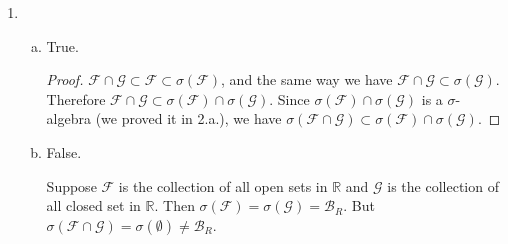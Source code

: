 \documentclass[11pt]{article}
\begin{document}
\begin{enumerate}[1.]
\begin{enumerate}[(a)]
\begin{proof}
            Then we have $\mathcal{A}$ is a countable collection in $\left\{(a,b) \times (c,d)\right\}$ and therefore $D \in \sigma(\left\{(a,b) \times (c,d)\right\})$.
            
            Finally, we argue that $D = O$. In the definition of $D$, we have obviously $D \subset O$. On the other hand, for every point $x = \{u,v\} \in O$, since $O$ is open, there is a open rectangle $x \in (a,b)\times(c,d) \subset O$.
            Then we have $a < u < b$ and $c < v < d$. Since $\mathbb{Q}$ is dense, we can find rational number $p,q,r,s$ such that $a<p<u<q<b$ and $c<r<v<s<d$. 
            Therefore $\{u,v\} \in (p,q)\times(r,s) \in \mathcal{A}$ $\Rightarrow \{u,v\} \in D$ $\Rightarrow O \subset D$. Therefore $D = O$.

            So every open set is in $\sigma(\left\{(a,b) \times (c,d)\right\})$ $\Rightarrow \mathcal{B}_{R^2} \subset \sigma(\left\{(a,b) \times (c,d)\right\}) \subset \sigma(\left\{[a,b] \times [c,d]\right\})$.

            Then $\mathcal{B}_{R^2} = \sigma(\left\{[a,b] \times [c,d]\right\})$.
        \end{proof}

    \end{enumerate}
    \item 
    \begin{enumerate}[(a)]
        \item
        True.
        \begin{proof}
            $\mathcal{F} \cap \mathcal{G} \subset \mathcal{F} \subset \sigma(\mathcal{F})$, and the same way we have $\mathcal{F} \cap \mathcal{G} \subset \sigma(\mathcal{G})$.
            Therefore $\mathcal{F} \cap \mathcal{G} \subset \sigma(\mathcal{F}) \cap \sigma(\mathcal{G})$. Since $\sigma(\mathcal{F}) \cap \sigma(\mathcal{G})$ is a $\sigma$-algebra (we proved it in 2.a.), we have $\sigma(\mathcal{F} \cap \mathcal{G}) \subset \sigma(\mathcal{F}) \cap \sigma(\mathcal{G})$.
        \end{proof}
        \item
        False.

        Suppose $\mathcal{F}$ is the collection of all open sets in $\mathbb{R}$ and $\mathcal{G}$ is the collection of all closed set in $\mathbb{R}$.
        Then $\sigma(\mathcal{F}) = \sigma(\mathcal{G}) = \mathcal{B}_R$. But $\sigma(\mathcal{F} \cap \mathcal{G}) = \sigma(\emptyset) \neq \mathcal{B}_R$. 
    \end{enumerate}
\end{enumerate}
\end{document}
